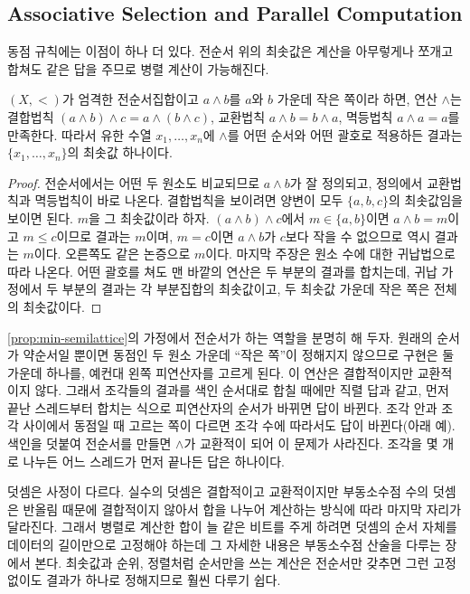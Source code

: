 \subsection{Associative Selection and Parallel Computation}

동점 규칙에는 이점이 하나 더 있다. 전순서 위의 최솟값은 계산을 아무렇게나 쪼개고 합쳐도 같은 답을 주므로 병렬 계산이 가능해진다.

\begin{proposition}
\label{prop:min-semilattice}
$(X,<)$가 엄격한 전순서집합이고 $a\wedge b$를 $a$와 $b$ 가운데 작은 쪽이라 하면, 연산 $\wedge$는 결합법칙 $(a\wedge b)\wedge c=a\wedge(b\wedge c)$, 교환법칙 $a\wedge b=b\wedge a$, 멱등법칙 $a\wedge a=a$를 만족한다. 따라서 유한 수열 $x_1,\dots,x_n$에 $\wedge$를 어떤 순서와 어떤 괄호로 적용하든 결과는 $\{x_1,\dots,x_n\}$의 최솟값 하나이다.
\end{proposition}

\begin{proof}
전순서에서는 어떤 두 원소도 비교되므로 $a\wedge b$가 잘 정의되고, 정의에서 교환법칙과 멱등법칙이 바로 나온다. 결합법칙을 보이려면 양변이 모두 $\{a,b,c\}$의 최솟값임을 보이면 된다. $m$을 그 최솟값이라 하자. $(a\wedge b)\wedge c$에서 $m\in\{a,b\}$이면 $a\wedge b=m$이고 $m\le c$이므로 결과는 $m$이며, $m=c$이면 $a\wedge b$가 $c$보다 작을 수 없으므로 역시 결과는 $m$이다. 오른쪽도 같은 논증으로 $m$이다. 마지막 주장은 원소 수에 대한 귀납법으로 따라 나온다. 어떤 괄호를 쳐도 맨 바깥의 연산은 두 부분의 결과를 합치는데, 귀납 가정에서 두 부분의 결과는 각 부분집합의 최솟값이고, 두 최솟값 가운데 작은 쪽은 전체의 최솟값이다.
\end{proof}

\cref{prop:min-semilattice}의 가정에서 전순서가 하는 역할을 분명히 해 두자. 원래의 순서가 약순서일 뿐이면 동점인 두 원소 가운데 ``작은 쪽''이 정해지지 않으므로 구현은 둘 가운데 하나를, 예컨대 왼쪽 피연산자를 고르게 된다. 이 연산은 결합적이지만 교환적이지 않다. 그래서 조각들의 결과를 색인 순서대로 합칠 때에만 직렬 답과 같고, 먼저 끝난 스레드부터 합치는 식으로 피연산자의 순서가 바뀌면 답이 바뀐다. 조각 안과 조각 사이에서 동점일 때 고르는 쪽이 다르면 조각 수에 따라서도 답이 바뀐다(아래 예). 색인을 덧붙여 전순서를 만들면 $\wedge$가 교환적이 되어 이 문제가 사라진다. 조각을 몇 개로 나누든 어느 스레드가 먼저 끝나든 답은 하나이다.

덧셈은 사정이 다르다. 실수의 덧셈은 결합적이고 교환적이지만 부동소수점 수의 덧셈은 반올림 때문에 결합적이지 않아서 합을 나누어 계산하는 방식에 따라 마지막 자리가 달라진다. 그래서 병렬로 계산한 합이 늘 같은 비트를 주게 하려면 덧셈의 순서 자체를 데이터의 길이만으로 고정해야 하는데 그 자세한 내용은 부동소수점 산술을 다루는 장에서 본다. 최솟값과 순위, 정렬처럼 순서만을 쓰는 계산은 전순서만 갖추면 그런 고정 없이도 결과가 하나로 정해지므로 훨씬 다루기 쉽다.

